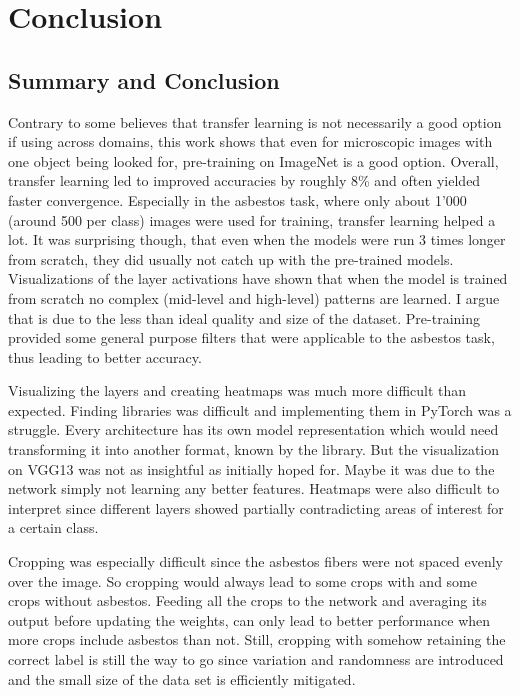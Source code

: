 \chapter{Conclusion}

\section{Summary and Conclusion}

Contrary to some believes that transfer learning is not necessarily a good option if using across domains, this work shows that even for microscopic images with one object being looked for, pre-training on ImageNet is a good option. Overall, transfer learning led to improved accuracies by roughly 8\% and often yielded faster convergence. Especially in the asbestos task, where only about 1'000 (around 500 per class) images were used for training, transfer learning helped a lot. It was surprising though, that even when the models were run 3 times longer from scratch, they did usually not catch up with the pre-trained models. Visualizations of the layer activations have shown that when the model is trained from scratch no complex (mid-level and high-level) patterns are learned. I argue that is due to the less than ideal quality and size of the dataset. Pre-training provided some general purpose filters that were applicable to the asbestos task, thus leading to better accuracy.

Visualizing the layers and creating heatmaps was much more difficult than expected. Finding libraries was difficult and implementing them in PyTorch was a struggle. Every architecture has its own model representation which would need transforming it into another format, known by the library. But the visualization on VGG13 was not as insightful as initially hoped for. Maybe it was due to the network simply not learning any better features. Heatmaps were also difficult to interpret since different layers showed partially contradicting areas of interest for a certain class.

Cropping was especially difficult since the asbestos fibers were not spaced evenly over the image. So cropping would always lead to some crops with and some crops without asbestos. Feeding all the crops to the network and averaging its output before updating the weights, can only lead to better performance when more crops include asbestos than not. Still, cropping with somehow retaining the correct label is still the way to go since variation and randomness are introduced and the small size of the data set is efficiently mitigated.

